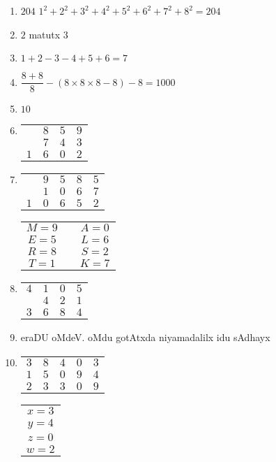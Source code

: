\begin{enumerate}
\item $204$ \quad $1^2+2^2+3^2+4^2+5^2+6^2+7^2+8^2=204$

\item $2$ matutx $3$

\item $1+2-3-4+5+6 =7$

\item $\dfrac{8+8}{8} - (8 \times 8 \times 8 - 8) - 8 = 1000$

\item $10$

\item
\begin{tabular}[t]{cccc}
  &$8$&$5$&$9$\\
  &$7$&$4$&$3$\\\cline{1-4}
  $1$&$6$&$0$&$2$
\end{tabular}

\item
  \begin{tabular}[t]{ccccc}
    &$9$&$5$&$8$&$5$\\
    &$1$&$0$&$6$&$7$\\\cline{1-5}
    $1$&$0$&$6$&$5$&$2$
  \end{tabular} \qquad 
  \begin{tabular}[t]{ccc}
    $M=9$& \quad& $A=0$\\
    $E=5$& \quad& $L=6$\\
    $R=8$& \quad& $S=2$\\
    $T=1$& \quad& $K=7$
  \end{tabular}
  
\item
  \begin{tabular}[t]{cccc}
    $4$&$1$&$0$&$5$\\
    &$4$&$2$&$1$\\\cline{1-4}
    $3$&$6$&$8$&$4$
  \end{tabular}
  
\item eraDU oMdeV. oMdu gotAtxda niyamadalilx idu sAdhayx

\item
  \begin{tabular}[t]{ccccc}
    $3$&$8$&$4$&$0$&$3$\\
    $1$&$5$&$0$&$9$&$4$\\\cline{1-5}
    $2$&$3$&$3$&$0$&$9$
  \end{tabular}\qquad
  \begin{tabular}[t]{c}
    $x=3$\\
    $y=4$\\
    $z=0$\\
    $w=2$
  \end{tabular}


\end{enumerate}
